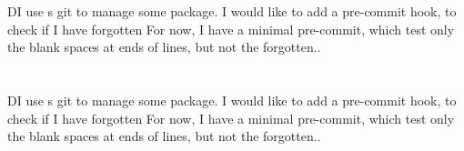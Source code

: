 \documentclass[a4paper, oneside, notitlepage, 12pt]{article}
\begin{document}
\endnumbering
\newpage
\section{}
DI use s git to manage some package.
I would like to add a pre-commit hook, to check if I have forgotten
For now, I have a minimal pre-commit, which test only the blank spaces at ends of lines, but not the forgotten..
\section{}
DI use s git to manage some package.
I would like to add a pre-commit hook, to check if I have forgotten
For now, I have a minimal pre-commit, which test only the blank spaces at ends of lines, but not the forgotten..
\end{document}
